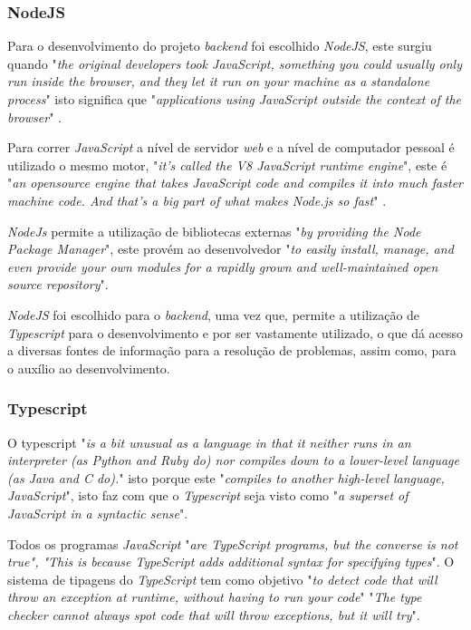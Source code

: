 \subsubsection{NodeJS}

Para o desenvolvimento do projeto \emph{backend} foi escolhido \textit{NodeJS}, este surgiu quando "\emph{the original developers took JavaScript, something you could usually only run inside the browser, and they let it run on your machine as a standalone process}"\citep{design_node} isto significa que "\emph{applications using JavaScript outside the context of the browser}"\citep{design_node} .

Para correr \textit{JavaScript} a nível de servidor \emph{web} e a nível de computador pessoal é utilizado o mesmo motor, "\emph{it's called the V8 JavaScript runtime engine}"\citep{design_node}, este é "\emph{an opensource engine that takes JavaScript code and compiles it into much faster machine code. And that's a big part of what makes Node.js so fast}"\citep{design_node} .

\textit{NodeJs} permite a utilização de bibliotecas externas "\emph{by providing the Node Package Manager}"\citep{design_node}, este provém ao desenvolvedor "\emph{to easily install, manage, and even provide  your own modules for a rapidly grown and well-maintained open source repository}"\citep{design_node}.

\textit{NodeJS} foi escolhido para o \textit{backend}, uma vez que, permite a utilização de \textit{Typescript} para o desenvolvimento e por ser vastamente utilizado, o que dá acesso a diversas fontes de informação para a resolução de problemas, assim como, para o auxílio ao desenvolvimento.

\newpage

\subsubsection{Typescript}
O typescript "\emph{is a bit unusual as a language in that it neither runs in an interpreter (as Python and Ruby do) nor compiles down to a lower-level language (as Java and C do).}"\citep{typescript} isto porque este "\emph{compiles to another high-level language, JavaScript}"\citep{typescript}, isto faz com que o \emph{Typescript} seja visto como "\emph{a superset of JavaScript in a syntactic sense}"\citep{typescript}.

Todos os programas \emph{JavaScript} "\emph{are TypeScript programs, but the converse is not true"\citep{typescript}, "This is because TypeScript adds additional syntax for specifying types}"\citep{typescript}. O sistema de tipagens do \emph{TypeScript} tem como objetivo "\emph{to detect code that will throw an exception at runtime, without having to run your code}"\citep{typescript} "\emph{The type checker cannot always spot code that will throw exceptions, but it will try}"\citep{typescript}.

